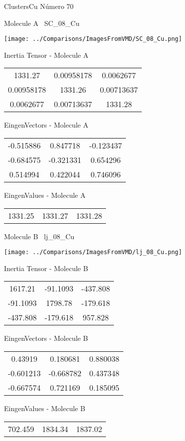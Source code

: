  \newpage

\vtab[-3cm]
\begin{center}
{\large ClustersCu \tab Número 70}
\end{center}
\begin{multicols}{2}
\begin{center}

Molecule A \
SC\_08\_Cu

\texttt{[image: ../Comparisons/ImagesFromVMD/SC\_08\_Cu.png]}

Inertia Tensor - Molecule A \\
\begin{tabular}{|c c c|}
1331.27	 & 	0.00958178	 & 	0.0062677	 \\
0.00958178	 & 	1331.26	 & 	0.00713637	 \\
0.0062677	 & 	0.00713637	 & 	1331.28
\end{tabular}

\vtab
 EingenVectors - Molecule A     \\
\begin{tabular}{|c c c|}
-0.515886	 & 	0.847718	 & 	-0.123437	 \\
-0.684575	 & 	-0.321331	 & 	0.654296	 \\
0.514994	 & 	0.422044	 & 	0.746096
\end{tabular}

\vtab
 EingenValues - Molecule A     \\
\begin{tabular}{|c c c|}
1331.25	 & 	1331.27	 & 	1331.28	 \\
\end{tabular}
\columnbreak

Molecule B \
lj\_08\_Cu

\texttt{[image: ../Comparisons/ImagesFromVMD/lj\_08\_Cu.png]}

Inertia Tensor - Molecule B \\
\begin{tabular}{|c c c|}
1617.21	 & 	-91.1093	 & 	-437.808	 \\
-91.1093	 & 	1798.78	 & 	-179.618	 \\
-437.808	 & 	-179.618	 & 	957.828
\end{tabular}

\vtab
 EingenVectors - Molecule B     \\
\begin{tabular}{|c c c|}
0.43919	 & 	0.180681	 & 	0.880038	 \\
-0.601213	 & 	-0.668782	 & 	0.437348	 \\
-0.667574	 & 	0.721169	 & 	0.185095
\end{tabular}

\vtab
 EingenValues - Molecule B     \\
\begin{tabular}{|c c c|}
702.459	 & 	1834.34	 & 	1837.02	 \\
\end{tabular}

\end{center}
\end{multicols}

